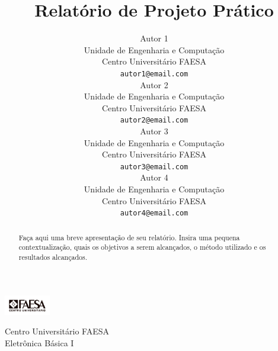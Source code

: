 \documentclass{article}
\title{Relatório de Projeto Prático}
\author{
  Autor 1 \\
  Unidade de Engenharia e Computação \\
  Centro Universitário FAESA \\
  \texttt{autor1@email.com} \\
  \And
  Autor 2 \\
  Unidade de Engenharia e Computação \\
  Centro Universitário FAESA \\
  \texttt{autor2@email.com} \\
  \And
  Autor 3 \\
  Unidade de Engenharia e Computação \\
  Centro Universitário FAESA\\
  \texttt{autor3@email.com} \\
  \And
  Autor 4 \\
  Unidade de Engenharia e Computação \\
  Centro Universitário FAESA\\
  \texttt{autor4@email.com} \\
}
\begin{document}
\noindent\begin{minipage}{0.15\textwidth}
\includegraphics[width=2.0cm]{imagens/logo_faesa_pb.png}
\end{minipage}
\hfill
\begin{minipage}{1\textwidth}\raggedright
Centro Universitário FAESA \\
Eletrônica Básica I \\
\end{minipage}

\maketitle

\begin{abstract}
  Faça aqui uma breve apresentação de seu relatório. Insira uma pequena contextualização, quais os objetivos a serem alcançados, o método utilizado e os resultados alcançados.
\end{abstract}













\printbibliography
\end{document}
